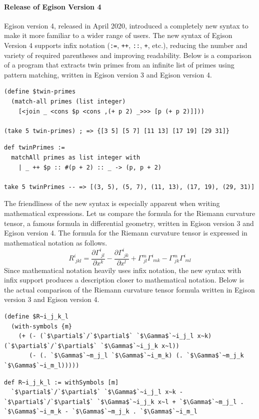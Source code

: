 \begin{oframed}
  \paragraph{Release of Egison Version 4}
Egison version 4, released in April 2020, introduced a completely new syntax to make it more familiar to a wider range of users.
The new syntax of Egison Version 4 supports infix notation (\lstinline{:=}, \lstinline{++}, \lstinline{::}, \lstinline{+}, etc.), reducing the number and variety of required parentheses and improving readability.
Below is a comparison of a program that extracts twin primes from an infinite list of primes using pattern matching, written in Egison version 3 and Egison version 4.
\begin{lstlisting}[caption=Egison version 3,language=egison,numbers=none]
(define $twin-primes
  (match-all primes (list integer)
    [<join _ <cons $p <cons ,(+ p 2) _>>> [p (+ p 2)]]))

(take 5 twin-primes) ; => {[3 5] [5 7] [11 13] [17 19] [29 31]}
\end{lstlisting}
\begin{lstlisting}[caption=Egison version 4,language=egison,numbers=none]
def twinPrimes :=
  matchAll primes as list integer with
    | _ ++ $p :: #(p + 2) :: _ -> (p, p + 2)

take 5 twinPrimes -- => [(3, 5), (5, 7), (11, 13), (17, 19), (29, 31)]
\end{lstlisting}

The friendliness of the new syntax is especially apparent when writing mathematical expressions.
Let us compare the formula for the Riemann curvature tensor, a famous formula in differential geometry, written in Egison version 3 and Egison version 4.
The formula for the Riemann curvature tensor is expressed in mathematical notation as follows.
\[R^{i}_{\;jkl} = \frac{\partial \Gamma^{i}_{\;jl}}{\partial x^k} - \frac{\partial \Gamma^{i}_{\;jk}}{\partial x^l} + \Gamma^{m}_{\;jl} \Gamma^{i}_{\;mk} - \Gamma^{m}_{\;jk} \Gamma^{i}_{\;ml} \]
Since mathematical notation heavily uses infix notation, the new syntax with infix support produces a description closer to mathematical notation.
Below is the actual comparison of the Riemann curvature tensor formula written in Egison version 3 and Egison version 4.
\begin{lstlisting}[caption=Egison version 3,language=egison,numbers=none]
(define $R~i_j_k_l
  (with-symbols {m}
    (+ (- (`$\partial$`/`$\partial$` `$\Gamma$`~i_j_l x~k) (`$\partial$`/`$\partial$` `$\Gamma$`~i_j_k x~l))
       (- (. `$\Gamma$`~m_j_l `$\Gamma$`~i_m_k) (. `$\Gamma$`~m_j_k `$\Gamma$`~i_m_l)))))
\end{lstlisting}
\begin{lstlisting}[caption=Egison version 4,language=egison,numbers=none]
def R~i_j_k_l := withSymbols [m]
  `$\partial$`/`$\partial$` `$\Gamma$`~i_j_l x~k - `$\partial$`/`$\partial$` `$\Gamma$`~i_j_k x~l + `$\Gamma$`~m_j_l . `$\Gamma$`~i_m_k - `$\Gamma$`~m_j_k . `$\Gamma$`~i_m_l
\end{lstlisting}
\end{oframed}


